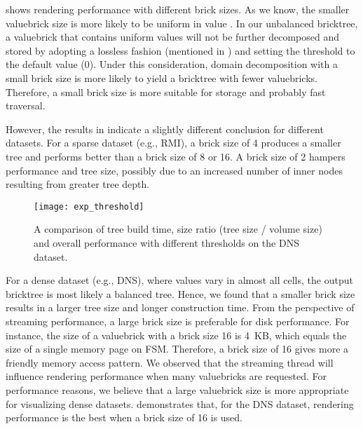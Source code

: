  shows rendering performance with different brick sizes.
As we know, the smaller valuebrick size is more likely to be uniform in value 
\cite{fogal2013analysis}. In our unbalanced bricktree, a valuebrick that contains
uniform values will not be further decomposed and stored by adopting a lossless 
fashion (mentioned in ) and setting the threshold 
to the default value (0). Under this consideration, domain decomposition with a 
small brick size is more likely to yield a bricktree with fewer valuebricks. 
Therefore, a small brick size is more suitable for storage and probably fast traversal. 

However, the results in  indicate a slightly
different conclusion for different datasets. For a sparse dataset (e.g., RMI),
a brick size of 4 produces a smaller tree and performs better than a brick size of 8 or 16.
A brick size of 2 hampers performance and tree size, possibly due to an increased number of
inner nodes resulting from greater tree depth. 

\begin{figure}[t]
    \centering
    \texttt{[image: exp\_threshold]}
    \vspace{-2em}
	\caption{\label{fig:exp_threshold}%
	A comparison of tree build time, size ratio (tree size / volume size) and overall performance with different thresholds on the DNS dataset.}
	\vspace{-0.5em}
\end{figure}


For a dense dataset (e.g., DNS), where values vary in almost all cells,
the output bricktree is most likely a balanced tree. Hence, we found that
a smaller brick size results in a larger tree size and longer construction time.
From the perspective of streaming performance, a large brick size is preferable 
for disk performance. For instance, the size of a valuebrick with a
brick size 16 is 4~KB, which equals the size of a single memory page on FSM. 
Therefore, a brick size of 16 gives more a friendly memory access pattern. 
We observed that the streaming thread will influence rendering performance
when many valuebricks are requested. For performance reasons, we believe that a 
large valuebrick size is more appropriate for visualizing dense datasets. 
 demonstrates that, for the DNS dataset, rendering
performance is the best when a brick size of 16 is used. 


